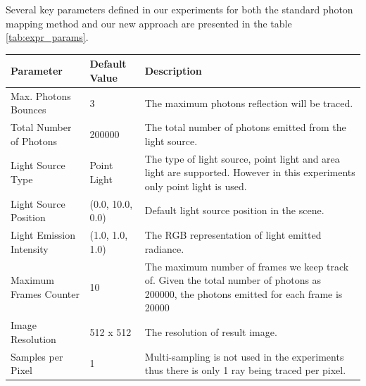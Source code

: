 Several key parameters defined in our experiments for both the standard photon mapping method and our new approach are presented in the table \ref{tab:expr_params}. 

\begin{table}[ht]
\begin{center}
	
	\renewcommand{\arraystretch}{1.2}
	\begin{tabular}{p{5cm}p{3cm}p{5cm}}
	
	Parameter  				& 		Default Value 		&		Description \\ 
	
	\hline 

	Max. Photons Bounces		& 		3					&		The maximum photons reflection will be traced. \\  

	\hline 					

	Total Number of Photons 	& 		200000				&		The total number of photons emitted from the light 																	source. \\

	\hline

	Light Source Type			& 		Point Light			& 		The type of light source, point light and area light
																are supported. However in this experiments only point 																	light is used. \\ 
	
	\hline
	
	Light Source Position 		& 	 	(0.0, 10.0, 0.0)		&		Default light source position in the scene. \\  


	\hline 
	
	Light Emission Intensity	&		(1.0, 1.0, 1.0)		&		The RGB representation of light emitted radiance.\\  

	\hline 

	Maximum Frames Counter 	& 		10 					& 		The maximum number of frames we keep track of. Given 																	the total number of photons as 200000, the photons 																	emitted for each frame is 20000\\

	\hline
	
	Image Resolution 			&		512 x 512				&		The resolution of result image. \\

	\hline 
	
	Samples per Pixel			& 		1 					& 		Multi-sampling is not used in the experiments thus 																	there is only 1 ray being traced per pixel.\\
	

\end{tabular}
\end{center}
\end{table}
